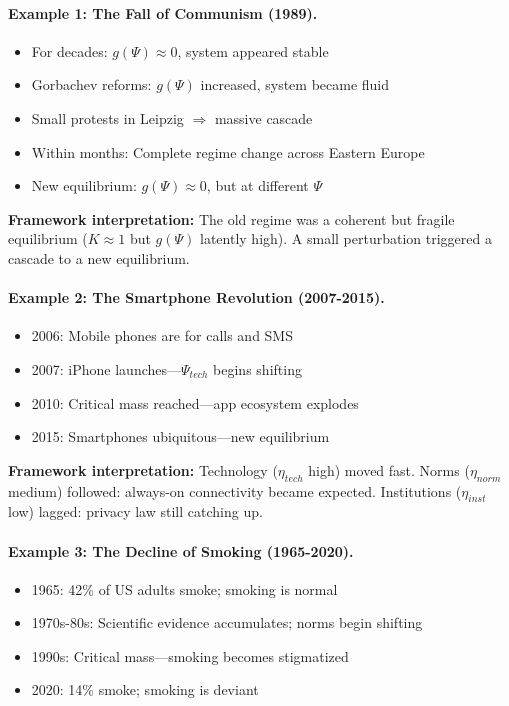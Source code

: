 \documentclass[12pt,a4paper]{article}
\begin{document}
\paragraph{Example 1: The Fall of Communism (1989).}
\begin{itemize}
  \item For decades: $g(\Psi) \approx 0$, system appeared stable
  \item Gorbachev reforms: $g(\Psi)$ increased, system became fluid
  \item Small protests in Leipzig $\Rightarrow$ massive cascade
  \item Within months: Complete regime change across Eastern Europe
  \item New equilibrium: $g(\Psi) \approx 0$, but at different $\Psi$
\end{itemize}

\textbf{Framework interpretation:}
The old regime was a coherent but fragile equilibrium ($K \approx 1$ but $g(\Psi)$ latently high).
A small perturbation triggered a cascade to a new equilibrium.

\paragraph{Example 2: The Smartphone Revolution (2007-2015).}
\begin{itemize}
  \item 2006: Mobile phones are for calls and SMS
  \item 2007: iPhone launches---$\Psi_{tech}$ begins shifting
  \item 2010: Critical mass reached---app ecosystem explodes
  \item 2015: Smartphones ubiquitous---new equilibrium
\end{itemize}

\textbf{Framework interpretation:}
Technology ($\eta_{tech}$ high) moved fast.
Norms ($\eta_{norm}$ medium) followed: always-on connectivity became expected.
Institutions ($\eta_{inst}$ low) lagged: privacy law still catching up.

\paragraph{Example 3: The Decline of Smoking (1965-2020).}
\begin{itemize}
  \item 1965: 42\% of US adults smoke; smoking is normal
  \item 1970s-80s: Scientific evidence accumulates; norms begin shifting
  \item 1990s: Critical mass---smoking becomes stigmatized
  \item 2020: 14\% smoke; smoking is deviant
\end{itemize}
\end{document}
